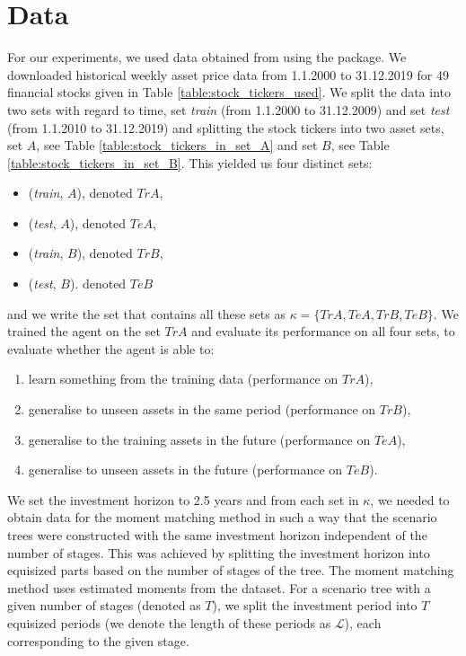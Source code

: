 \section{Data}
For our experiments, we used data obtained from \cite{yahoo} using the \cite[version 0.1.74]{yfinance} package. We downloaded historical weekly asset price data from 1.1.2000 to 31.12.2019 for 49 financial stocks given in Table \ref{table:stock_tickers_used}. We split the data into two sets with regard to time, set \textit{train} (from 1.1.2000 to 31.12.2009) and set \textit{test} (from 1.1.2010 to 31.12.2019) and splitting the stock tickers into two asset sets, set $A$, see Table \ref{table:stock_tickers_in_set_A} and set $B$, see Table \ref{table:stock_tickers_in_set_B}. This yielded us four distinct sets:
\begin{itemize}
\item (\textit{train}, $A$), denoted $TrA$,
\item (\textit{test}, $A$), denoted $TeA$,
\item (\textit{train}, $B$), denoted $TrB$,
\item (\textit{test}, $B$). denoted $TeB$
\end{itemize}
and we write the set that contains all these sets as $\kappa=\{TrA, TeA, TrB, TeB\}$.
We trained the agent on the set $TrA$ and evaluate its performance on all four sets, to evaluate whether the agent is able to:
\begin{enumerate}
\item learn something from the training data (performance on $TrA$),
\item generalise to unseen assets in the same period (performance on $TrB$),
\item generalise to the training assets in the future (performance on $TeA$),
\item generalise to unseen assets in the future (performance on $TeB$).
\end{enumerate}

We set the investment horizon to 2.5 years and from each set in $\kappa$, we needed to obtain data for the moment matching method in such a way that the scenario trees were constructed with the same investment horizon independent of the number of stages. This was achieved by splitting the investment horizon into equisized parts based on the number of stages of the tree.
The moment matching method uses estimated moments from the dataset. For a scenario tree with a given number of stages (denoted as $T$), we split the investment period into $T$ equisized periods (we denote the length of these periods as $\mathcal{L}$), each corresponding to the given stage.

